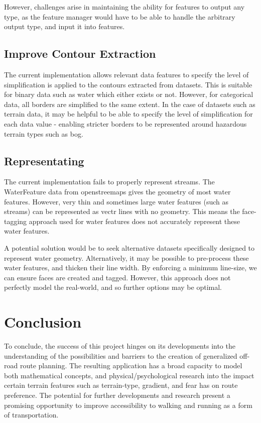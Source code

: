 \documentclass[12pt]{article}
\begin{document}
However, challenges arise in maintaining the ability for features to output any type, as the feature manager would have to be able to handle the arbitrary output type, and input it into features.

\subsection{Improve Contour Extraction}

The current implementation allows relevant data features to specify the level of simplification is applied to the contours extracted from datasets. This is suitable for binary data such as water which either exists or not. However, for categorical data, all borders are simplified to the same extent. In the case of datasets such as terrain data, it may be helpful to be able to specify the level of simplification for each data value - enabling stricter borders to be represented around hazardous terrain types such as bog.

\subsection{Representating}

The current implementation fails to properly represent streams. The WaterFeature data from openstreemaps gives the geometry of most water features. However, very thin and sometimes large water features (such as streams) can be represented as vectr lines with no geometry. This means the face-tagging approach used for water features does not accurately represent these water features.

A potential solution would be to seek alternative datasets specifically designed to represent water geometry. Alternatively, it may be possible to pre-process these water features, and thicken their line width. By enforcing a minimum line-size, we can ensure faces are created and tagged. However, this approach does not perfectly model the real-world, and so further options may be optimal.

\section{Conclusion}

To conclude, the success of this project hinges on its developments into the understanding of the possibilities and barriers to the creation of generalized off-road route planning. The resulting application has a broad capacity to model both mathematical concepts, and physical/psychological research into the impact certain terrain features such as terrain-type, gradient, and fear has on route preference. The potential for further developments and research present a promising opportunity to improve accessibility to walking and running as a form of transportation.
\end{document}
